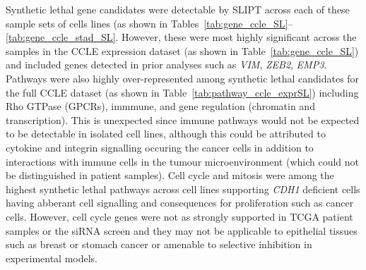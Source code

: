 Synthetic lethal gene candidates were detectable by \gls{SLIPT} across each of these sample sets of cells lines (as shown in Tables~\ref{tab:gene_ccle_SL}\nobreakdash--\ref{tab:gene_ccle_stad_SL}. However, these were most highly significant across the samples in the CCLE expression dataset (as shown in Table~\ref{tab:gene_ccle_SL}) and included genes detected in prior analyses such as \textit{VIM}, \textit{ZEB2}, \textit{EMP3}. Pathways were also highly over-represented among synthetic lethal candidates for the full CCLE dataset (as shown in Table~\ref{tab:pathway_ccle_exprSL}) including Rho GTPase (GPCRs), immmune, and gene regulation (chromatin and transcription). This is unexpected since immune pathways would not be expected to be detectable in isolated cell lines, although this could be attributed to cytokine and integrin signalling occuring the cancer cells in addition to interactions with immune cells in the tumour microenvironment (which could not be distinguished in patient samples). Cell cycle and mitosis were among the highest synthetic lethal pathways across cell lines supporting \textit{CDH1} deficient cells having abberant cell signalling and consequences for proliferation such as cancer cells. However, cell cycle genes were not as strongly supported in TCGA patient samples or the siRNA screen \citep{Telford2015} and they may not be applicable to epithelial tissues such as breast or stomach cancer or amenable to selective inhibition in experimental models.   

